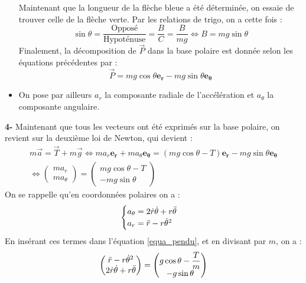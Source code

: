 \documentclass{article}
\begin{document}
\begin{itemize}
\noindent Maintenant que la longueur de la flèche bleue a été déterminée, on essaie de trouver celle de la flèche verte. Par les relations de trigo, on a cette fois : 
\begin{equation*}
    \label{projection_poids2}
    \sin{\theta} = \dfrac{\textrm{Opposé}}{\textrm {Hypoténuse}} = \dfrac{B}{C} = \dfrac{B}{mg} \iff B = mg\sin{\theta}    
\end{equation*}
Finalement, la décomposition de $\vec P$ dans la base polaire est donnée selon les équations précédentes par : 
\begin{equation*}
    \vec P = mg\cos{\theta}\mathbf{ e_r}-mg\sin{\theta}\mathbf{e_\theta}
\end{equation*}

\item On pose par ailleurs $a_r$ la composante radiale de l'accélération et $a_\theta$ la composante angulaire. \\
\end{itemize} 
\indent \textbf{4-} Maintenant que tous les vecteurs ont été exprimés sur la base polaire, on revient sur la deuxième loi de Newton, qui devient :
\begin{gather}
    m\vec a = \vec T + m\vec g  \iff   ma_r\mathbf{e_r} + ma_\theta\mathbf{e_\theta} = (mg\cos{\theta} - T)\mathbf{e_r}  -mg\sin{\theta}\mathbf{e_\theta}  \\
    \iff \begin{pmatrix} ma_r \\
     ma_\theta 
    \end{pmatrix} = \begin{pmatrix} mg\cos{\theta} - T \\
     -mg\sin{\theta} 
    \end{pmatrix}
    \label{equa_pendu}
\end{gather}
On se rappelle qu'en coordonnées polaires on a :
\[\begin{cases} a_{\theta} =  2\dot r\dot \theta + r\Ddot{\theta} \\
 a_{r} = \ddot r - r{\dot\theta}^2  \end{cases} \]
En insérant ces termes dans l'équation \ref{equa_pendu}, et en divisant par $m$, on a :
\begin{equation*}
\begin{pmatrix} 
      \ddot r - r{\dot\theta}^2  \\
     2\dot r\dot \theta + r\Ddot{\theta}
\end{pmatrix} = 
\begin{pmatrix} g\cos{\theta} - \dfrac{T}{m} \\
     -g\sin{\theta} 
\end{pmatrix}
\label{equa_pendu_2}
\end{equation*}
\end{document}
